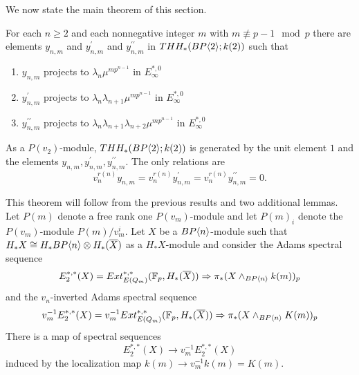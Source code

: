 We now state the main theorem of this section. 
\begin{thm}\label{mod p v_1}
For each $n \ge 2$ and each nonnegative integer $m$ with $m \not\equiv p - 1 \mod{p}$ there are elements $y_{n,m}$ and $y^{\prime}_{n,m}$ and $y^{\prime \prime}_{n,m}$ in $THH_*(BP\langle 2 \rangle;k(2))$ such that
\begin{enumerate} 
\item $y_{n,m}$ projects to $\lambda_n\mu^{mp^{n-1}}$ in $E_{\infty}^{*,0}$
\item $y_{n,m}^{\prime}$ projects to $\lambda_n\lambda_{n+1}\mu^{mp^{n-1}}$ in $E_{\infty}^{*,0}$
\item $y_{n,m}^{\prime\prime}$ projects to $\lambda_n\lambda_{n+1}\lambda_{n+2}\mu^{mp^{n-1}}$ in $E_{\infty}^{*,0}$
\end{enumerate}
 As a $P(v_2)$-module, $THH_*(BP\langle 2 \rangle;k(2))$ is generated by the unit element
$1$ and the elements $y_{n,m},y_{n,m}^{\prime},y_{n,m}^{\prime \prime}$. The only relations are
\[v_n^{r(n)}y_{n,m}=v_n^{r(n)}y_{n,m}^{\prime}=v_n^{r(n)}y_{n,m}^{\prime\prime}=0.\]
\end{thm}
This theorem will follow from the previous results and two additional lemmas. 
Let $P(m)$ denote a free rank one $P(v_m)$-module and let $P(m)_i$ denote the $P(v_m)$-module $P(m)/v_m^i$. Let $X$ be a $BP\langle n \rangle$-module such that $H_*X\cong H_*BP\langle n \rangle\otimes H_*(\overline{X})$ as a $H_*X$-module and consider the Adams spectral sequence
\begin{equation}\label{ASSX} E_2^{*,*}(X)=Ext_{E(Q_m)}^{*,*}(\mathbb{F}_p,H_*(\overline{X}))\Rightarrow \pi_*(X\wedge_{BP\langle n \rangle}k(m))_p\end{equation}
and the $v_n$-inverted Adams spectral sequence 
\begin{equation}\label{v2invertASSX} v_m^{-1}E_2^{*,*}(X)=v_m^{-1}Ext_{E(Q_m)}^{*,*}(\mathbb{F}_p,H_*(\overline{X})) \Rightarrow \pi_*(X\wedge_{BP\langle n \rangle}K(m))_p\end{equation}
There is a map of spectral sequences 
\[ E_2^{*,*}(X) \longrightarrow v_m^{-1}E_2^{*,*}(X)\]
induced by the localization map $k(m)\to v_m^{-1}k(m)=K(m).$ 

